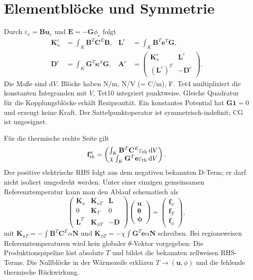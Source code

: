 \section{Elementblöcke und Symmetrie}
Durch $\varepsilon_v=\mathbf B\mathbf u_e$ und $\mathbf E=-\mathbf G\phi_e$ folgt
\begin{align}\label{eq:piezo-blocks}
\mathbf K_u^e&=\int_K\mathbf B^T\mathbf C^E\mathbf B,&
\mathbf L^e&=\int_K\mathbf B^T\mathbf e^T\mathbf G,\\
\mathbf D^e&=\int_K\mathbf G^T\boldsymbol\kappa^S\mathbf G,&
\mathbf A^e&=\begin{pmatrix}\mathbf K_u^e&\mathbf L^e\\
(\mathbf L^e)^T&-\mathbf D^e\end{pmatrix}.\nonumber
\end{align}
Die Maße sind $\mathrm dV$. Blöcke haben N/m, N/V (= C/m), F.
Tet4 multipliziert die konstanten Integranden mit $V$, Tet10 integriert
punktweise. Gleiche Quadratur für die Kopplungsblöcke erhält Reziprozität.
Ein konstantes Potential hat $\mathbf G\mathbf 1=0$ und erzeugt keine Kraft.
Der Sattelpunktoperator ist symmetrisch-indefinit; CG ist ungeeignet.

Für die thermische rechte Seite gilt
\begin{equation}\label{eq:piezo-thermal-rhs}
\mathbf f_{\rm th}^e=\begin{pmatrix}
\int_K\mathbf B^T\mathbf C^E\varepsilon_{\rm th}\,\mathrm dV\\
\chi\int_K\mathbf G^T\mathbf e\varepsilon_{\rm th}\,\mathrm dV
\end{pmatrix}.
\end{equation}
Der positive elektrische RHS folgt aus dem negativen bekannten D-Term;
er darf nicht isoliert umgedreht werden. Unter einer einzigen gemeinsamen
Referenztemperatur kann man den Ablauf schematisch als
\begin{equation}\label{eq:triangular-coupling}
\begin{pmatrix}
\mathbf K_u&\mathbf K_{uT}&\mathbf L\\
0&\mathbf K_T&0\\
\mathbf L^T&\mathbf K_{\phi T}&-\mathbf D
\end{pmatrix}
\begin{pmatrix}\mathbf u\\\boldsymbol\theta\\\boldsymbol\phi\end{pmatrix}
=\begin{pmatrix}\mathbf f_u\\\mathbf f_T\\\mathbf f_\phi\end{pmatrix},
\end{equation}
mit $\mathbf K_{uT}=-\int\mathbf B^T\mathbf C^E\alpha\mathbf N$ und
$\mathbf K_{\phi T}=-\chi\int\mathbf G^T\mathbf e\alpha\mathbf N$ schreiben.
Bei regionsweisen Referenztemperaturen wird kein globaler $\theta$-Vektor
vorgegeben: Die Produktionspipeline löst absolute $T$ und bildet die bekannten
zellweisen RHS-Terme. Die Nullblöcke in der Wärmezeile erklären
$T\rightarrow(\mathbf u,\phi)$ und die fehlende thermische Rückwirkung.

